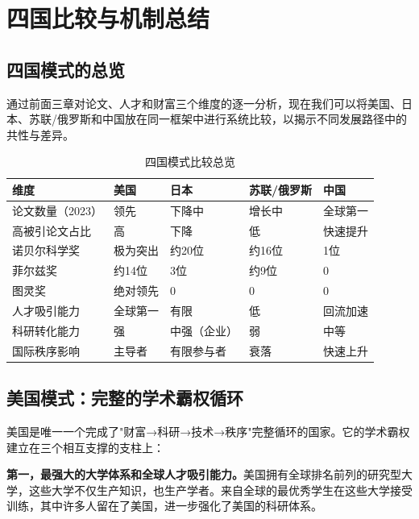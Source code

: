 \section{四国比较与机制总结}

\subsection{四国模式的总览}

\noindent 通过前面三章对论文、人才和财富三个维度的逐一分析，现在我们可以将美国、日本、苏联/俄罗斯和中国放在同一框架中进行系统比较，以揭示不同发展路径中的共性与差异。

\begin{table}[H]
\centering
\caption{四国模式比较总览}
\label{tab:comparison}
\begin{tabular}{p{3cm}p{2.5cm}p{2.5cm}p{2.5cm}p{2.5cm}}
\toprule
\textbf{维度} & \textbf{美国} & \textbf{日本} & \textbf{苏联/俄罗斯} & \textbf{中国} \\
\midrule
论文数量（2023） & 领先 & 下降中 & 增长中 & 全球第一 \\
高被引论文占比 & 高 & 下降 & 低 & 快速提升 \\
诺贝尔科学奖 & 极为突出 & 约20位 & 约16位 & 1位 \\
菲尔兹奖 & 约14位 & 3位 & 约9位 & 0 \\
图灵奖 & 绝对领先 & 0 & 0 & 0 \\
人才吸引能力 & 全球第一 & 有限 & 低 & 回流加速 \\
科研转化能力 & 强 & 中强（企业） & 弱 & 中等 \\
国际秩序影响 & 主导者 & 有限参与者 & 衰落 & 快速上升 \\
\bottomrule
\end{tabular}
\end{table}

\subsection{美国模式：完整的学术霸权循环}

美国是唯一一个完成了"财富→科研→技术→秩序"完整循环的国家。它的学术霸权建立在三个相互支撑的支柱上：

\textbf{第一，最强大的大学体系和全球人才吸引能力。}美国拥有全球排名前列的研究型大学，这些大学不仅生产知识，也生产学者。来自全球的最优秀学生在这些大学接受训练，其中许多人留在了美国，进一步强化了美国的科研体系。

